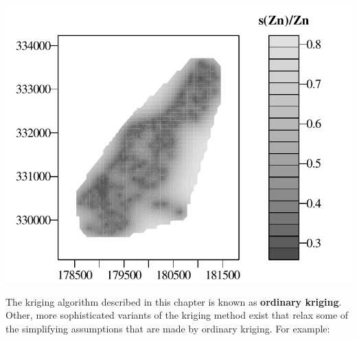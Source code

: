 \noindent\begin{minipage}[t][][b]{.6\textwidth}
\includegraphics[width=\textwidth]{../figures/meusecontourerr.pdf}\medskip
\end{minipage}
\begin{minipage}[t][][t]{.39\textwidth}
  \label{fig:meusecontourerr}
\end{minipage}

The kriging algorithm described in this chapter is known as
\textbf{ordinary kriging}.  Other, more sophisticated variants of the
kriging method exist that relax some of the simplifying assumptions
that are made by ordinary kriging.  For example:

